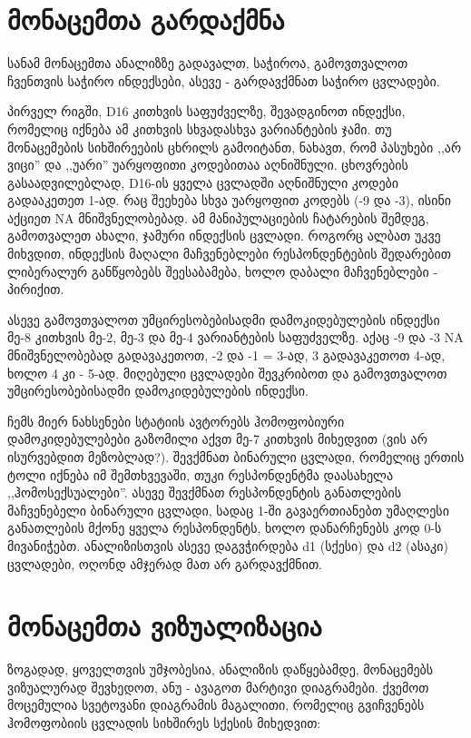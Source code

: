 \documentclass{article}\usepackage[]{graphicx}\usepackage[]{color}
\begin{document}
\section*{მონაცემთა გარდაქმნა}

სანამ მონაცემთა ანალიზზე გადავალთ, საჭიროა, გამოვთვალოთ ჩვენთვის საჭირო ინდექსები, ასევე - გარდავქმნათ საჭირო ცვლადები.

პირველ რიგში, D16 კითხვის საფუძველზე, შევადგინოთ ინდექსი, რომელიც იქნება ამ კითხვის სხვადასხვა ვარიანტების ჯამი. თუ მონაცემების სიხშირეების ცხრილს გამოიტანთ, ნახავთ, რომ პასუხები ,,არ ვიცი'' და ,,უარი'' უარყოფითი კოდებითაა აღნიშნული. ცხოვრების გასაადვილებლად, D16-ის ყველა ცვლადში აღნიშნული კოდები გადააკეთეთ 1-ად. რაც შეეხება სხვა უარყოფით კოდებს (-9 და -3), ისინი აქციეთ NA მნიშვნელობებად. ამ მანიპულაციების ჩატარების შემდეგ, გამოთვალეთ ახალი, ჯამური ინდექსის ცვლადი. როგორც ალბათ უკვე მიხვდით, ინდექსის მაღალი მაჩვენებლები რესპონდენტების შედარებით ლიბერალურ განწყობებს შეესაბამება, ხოლო დაბალი მაჩვენებლები - პირიქით.

ასევე გამოვთვალოთ უმცირესობებისადმი დამოკიდებულების ინდექსი მე-8 კითხვის მე-2, მე-3 და მე-4 ვარიანტების საფუძველზე. აქაც -9 და -3 NA მნიშვნელობებად გადავაკეთოთ, -2 და -1 = 3-ად, 3 გადავაკეთოთ 4-ად, ხოლო 4 კი - 5-ად. მიღებული ცვლადები შევკრიბოთ და გამოვთვალოთ უმცირესობებისადმი დამოკიდებულების ინდექსი.

ჩემს მიერ ნახსენები სტატიის ავტორებს ჰომოფობიური დამოკიდებულებები გაზომილი აქვთ მე-7 კითხვის მიხედვით (ვის არ ისურვებდით მეზობლად?). შევქმნათ ბინარული ცვლადი, რომელიც ერთის ტოლი იქნება იმ შემთხვევაში, თუკი რესპონდენტმა დაასახელა ,,ჰომოსექსუალები''. ასევე შევქმნათ რესპონდენტის განათლების მაჩვენებელი ბინარული ცვლადი, სადაც 1-ში გავაერთიანებთ უმაღლესი განათლების მქონე ყველა რესპონდენტს, ხოლო დანარჩენებს კოდ 0-ს მივანიჭებთ. ანალიზისთვის ასევე დაგვჭირდება d1 (სქესი) და d2 (ასაკი) ცვლადები, ოღონდ ამჯერად მათ არ გარდავქმნით.

\section*{მონაცემთა ვიზუალიზაცია}

ზოგადად, ყოველთვის უმჯობესია, ანალიზის დაწყებამდე, მონაცემებს ვიზუალურად შევხედოთ, ანუ - ავაგოთ მარტივი დიაგრამები. ქვემოთ მოცემულია სვეტოვანი დიაგრამის მაგალითი, რომელიც გვიჩვენებს ჰომოფობიის ცვლადის სიხშირეს სქესის მიხედვით:
\end{document}
